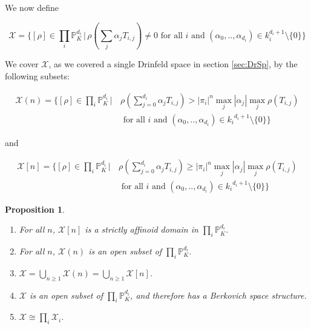 \documentclass{amsart}
\theoremstyle{theorem}
\theoremstyle{lemma}
\theoremstyle{prop}
\newtheorem{prop}[lemma]{Proposition}
\theoremstyle{definition}
\theoremstyle{corollary}
\theoremstyle{remark}
\newcommand{\X}{\mathcal{X}}
\newcommand{\PR}{\mathbb{P}}
\begin{document}
We now define

$$ \X = \Big \{[\rho] \in \prod_i \PR^{d_i}_K \, | \,  \rho(\sum_j \alpha_j T_{i,j}) \neq 0 \text{ for all }i \text{ and } (\alpha_0,..,\alpha_{d_i})\in k_i^{d_i+1}\setminus \{0\} \Big \} $$

We cover $\X$, as we covered a single Drinfeld space in section \ref{sec:DrSp}, by the following subsets:


\begin{equation*}
\begin{split}
\X(n)=\Big \{   [\rho]\in \prod_i \PR^{d_i}_K \, | \, & \rho(\sum_{j=0}^{d_i}\alpha_j T_{i,j}) > |\pi_i|^n   \max_j {|\alpha_j|}\max_j {\rho(T_{i,j})}  \\
 & \text{ for all } i \text{ and } (\alpha_0,..,\alpha_{d_i})\in {k_i}^{d_i+1} \setminus \{0\}\Big \} 
\end{split}
\end{equation*}

and 

\begin{equation*}
\begin{split}
\X[n]=\Big \{   [\rho]\in \prod_i \PR^{d_i}_K \, | \, & \rho(\sum_{j=0}^{d_i}\alpha_j T_{i,j}) \geq |\pi_i|^n   \max_j {|\alpha_j|}\max_j {\rho(T_{i,j})}  \\
 & \text{ for all } i \text{ and } (\alpha_0,..,\alpha_{d_i})\in {k_i}^{d_i+1} \setminus \{0\} \Big \} 
\end{split}
\end{equation*}
\begin{prop}
\label{prodstruct}
\begin{enumerate}

\item For all $n$, $\X[n]$ is a strictly affinoid domain in $\prod_i \PR^{d_i}_K$.
\item For all $n$, $\X(n)$ is an open subset of $\prod_i \PR^{d_i}_K$.
\item $\X = \bigcup_{n \geq 1} \X(n) =  \bigcup_{n \geq 1} \X[n]$.
\item $\X$ is an open subset of $\prod_i \PR^{d_i}_K$, and therefore has a Berkovich space structure.
\item $\X \cong \prod_i \X_i$.

\end{enumerate}
\end{prop}
\end{document}
